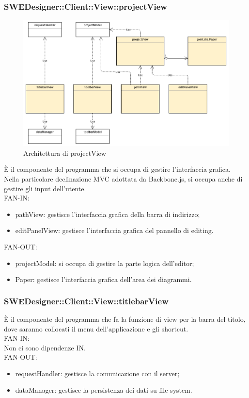 \documentclass[../PianoDiQualifica.tex]{subfiles}
\begin{document}
		\subsubsection{SWEDesigner::Client::View::projectView}
			\begin{figure}[H]\label{fig:MainModel}
				\centering
				\includegraphics[scale=0.44]{Immagini/DiagrammaArchitettura/MainView.png}
				\caption{Architettura di projectView}
			\end{figure}
		È il componente del programma che si occupa di gestire l'interfaccia grafica. Nella particolare declinazione MVC adottata da Backbone.js, si occupa anche di gestire gli input dell'utente.\\
			FAN-IN:
			\begin{itemize}
				\item pathView: gestisce l'interfaccia grafica della barra di indirizzo;
				\item editPanelView: gestisce l'interfaccia grafica del pannello di editing.
			\end{itemize}
			FAN-OUT:
			\begin{itemize}
				\item projectModel: si occupa di gestire la parte logica dell'editor;
				\item Paper: gestisce l'interfaccia grafica dell'area dei diagrammi.
			\end{itemize}
		\subsubsection{SWEDesigner::Client::View::titlebarView}
		È il componente del programma che fa la funzione di view per la barra del titolo, dove saranno collocati il menu dell’applicazione e gli shortcut.\\
			FAN-IN:\\
			Non ci sono dipendenze IN.\\
			FAN-OUT:
			\begin{itemize}
				\item requestHandler: gestisce la comunicazione con il server;
				\item dataManager: gestisce la persistenza dei dati su file system.
			\end{itemize}
\end{document}
